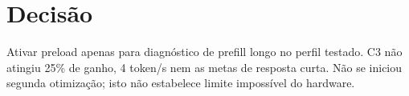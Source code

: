 \section{Decisão}
 Ativar preload apenas para diagnóstico de prefill longo no perfil testado. C3 não atingiu 25\% de ganho, 4 token/s nem as metas de resposta curta. Não se iniciou segunda otimização; isto não estabelece limite impossível do hardware. 
